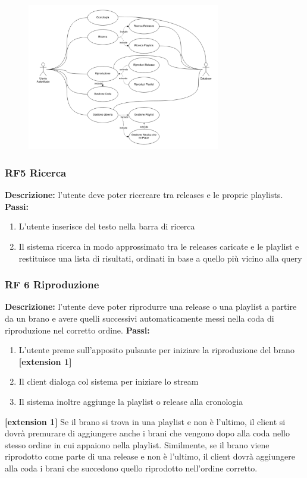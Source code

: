 \documentclass[a4paper,12pt]{article}
\begin{document}
\begin{figure}[htp]
    \centering
    \includegraphics[width=0.75\textwidth]{diagrams/use-case-5-6-7-8-9-10-11-12-13.png}
\end{figure}

\subsubsection*{RF5 Ricerca}
\textbf{Descrizione:} l’utente deve poter ricercare tra releases e le proprie playlists. \newline
\textbf{Passi:}
\begin{enumerate}
    \item L’utente inserisce del testo nella barra di ricerca
    \item Il sistema ricerca in modo approssimato tra le releases caricate e le playlist e restituisce una lista di risultati, ordinati in base a quello più vicino alla query
\end{enumerate}

\subsubsection*{RF 6 Riproduzione}

\textbf{Descrizione:} l’utente deve poter riprodurre una release o una playlist a partire da un brano e avere quelli successivi automaticamente messi nella coda di riproduzione nel corretto ordine. \newline
\textbf{Passi:}
\begin{enumerate}
    \item L’utente preme sull’apposito pulsante per iniziare la riproduzione del brano \textbf{[extension 1]}
    \item Il client dialoga col sistema per iniziare lo stream
    \item Il sistema inoltre aggiunge la playlist o release alla cronologia
\end{enumerate}
\textbf{[extension 1]} Se il brano si trova in una playlist e non è l’ultimo, il client si dovrà premurare di aggiungere anche i brani che vengono dopo alla coda nello stesso ordine in cui appaiono nella playlist. Similmente, se il brano viene riprodotto come parte di una release e non è l’ultimo, il client dovrà aggiungere alla coda i brani che succedono quello riprodotto nell’ordine corretto.
\end{document}
